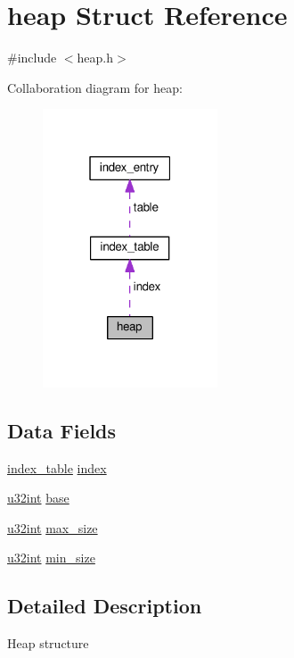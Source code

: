 \hypertarget{structheap}{}\section{heap Struct Reference}
\label{structheap}


{\ttfamily \#include $<$heap.\+h$>$}



Collaboration diagram for heap\+:\nopagebreak
\begin{figure}[H]
\begin{center}
\leavevmode
\includegraphics[width=147pt]{structheap__coll__graph}
\end{center}
\end{figure}
\subsection*{Data Fields}
\begin{DoxyCompactItemize}
\item 
\hyperlink{structindex__table}{index\+\_\+table} \hyperlink{structheap_af44ecb378e6839e4c91808d259825274}{index}
\item 
\hyperlink{system_8h_a757de76cafbcddaac0d1632902fe4cb8}{u32int} \hyperlink{structheap_ab5763c2b18c825c8b8fba44b2e60ddc1}{base}
\item 
\hyperlink{system_8h_a757de76cafbcddaac0d1632902fe4cb8}{u32int} \hyperlink{structheap_aff98f60fdff673e586a88d147da4798c}{max\+\_\+size}
\item 
\hyperlink{system_8h_a757de76cafbcddaac0d1632902fe4cb8}{u32int} \hyperlink{structheap_af515ec763221e45adce632886c4cb888}{min\+\_\+size}
\end{DoxyCompactItemize}


\subsection{Detailed Description}
Heap structure 

